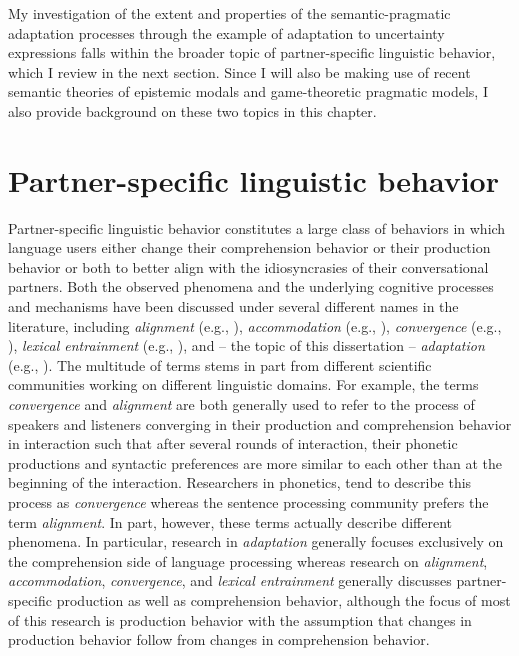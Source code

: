 My investigation of the extent and properties of the semantic-pragmatic adaptation processes through the example of adaptation to uncertainty expressions  falls within the broader topic of partner-specific linguistic behavior, which I review in the next section. Since I will also be making use of recent semantic theories of epistemic
modals and game-theoretic pragmatic models, I also provide background on these two topics in this chapter.

\section{Partner-specific linguistic behavior}

Partner-specific linguistic behavior constitutes a large class of behaviors in which language users either change their comprehension behavior or their production behavior or both to better align with the idiosyncrasies of their conversational partners. Both the observed phenomena and the underlying cognitive processes and mechanisms have been discussed under several different names in the literature, including \textit{alignment} (e.g., \cite{PickeringGarrod2004}), \textit{accommodation} (e.g., \cite{Goldinger1998}), \textit{convergence} (e.g., \cite{Pardo2006}), \textit{lexical entrainment} (e.g., \cite{ClarkWilkesGibbs1986}), and -- the topic of this dissertation -- \textit{adaptation} (e.g., \cite{KleinschmidtJaeger2015}). The multitude of terms stems in part from different scientific communities working on different linguistic domains. For example, the terms \textit{convergence} and \textit{alignment} 
are both generally used to refer to the process of speakers and listeners converging in their production and comprehension behavior in interaction such that after several rounds of interaction, 
their phonetic productions and syntactic preferences are more similar to each other than at the beginning of the interaction. Researchers in phonetics, tend to describe this process as \textit{convergence} 
whereas the sentence processing community prefers the term \textit{alignment}. In part, however, these terms actually describe different phenomena. In particular, research in \textit{adaptation} generally focuses exclusively
on the comprehension side of language processing whereas research on \textit{alignment}, \textit{accommodation}, \textit{convergence}, and \textit{lexical entrainment} generally discusses partner-specific production as well as comprehension behavior, although the focus of most of this research is production behavior with the assumption that changes in production behavior follow from changes in comprehension behavior.

